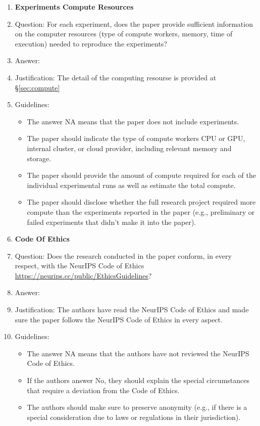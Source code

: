 \documentclass[11pt]{article}
\theoremstyle{plain}
\theoremstyle{definition}
\theoremstyle{remark}
\renewcommand{\^}[1]{^{(#1)}}
\begin{document}
\begin{enumerate}
\item {\bf Experiments Compute Resources}
    \item[] Question: For each experiment, does the paper provide sufficient information on the computer resources (type of compute workers, memory, time of execution) needed to reproduce the experiments?
    \item[] Answer: \answerYes{}
    \item[] Justification: The detail of the computing resourse is provided at \S\ref{sec:compute}
    \item[] Guidelines:
    \begin{itemize}
        \item The answer NA means that the paper does not include experiments.
        \item The paper should indicate the type of compute workers CPU or GPU, internal cluster, or cloud provider, including relevant memory and storage.
        \item The paper should provide the amount of compute required for each of the individual experimental runs as well as estimate the total compute. 
        \item The paper should disclose whether the full research project required more compute than the experiments reported in the paper (e.g., preliminary or failed experiments that didn't make it into the paper). 
    \end{itemize}

\item {\bf Code Of Ethics}
    \item[] Question: Does the research conducted in the paper conform, in every respect, with the NeurIPS Code of Ethics \url{https://neurips.cc/public/EthicsGuidelines}?
    \item[] Answer: \answerYes{} 
    \item[] Justification: The authors have read the NeurIPS Code of Ethics and made sure the paper follows the NeurIPS Code of Ethics in every aspect.
    \item[] Guidelines:
    \begin{itemize}
        \item The answer NA means that the authors have not reviewed the NeurIPS Code of Ethics.
        \item If the authors answer No, they should explain the special circumstances that require a deviation from the Code of Ethics.
        \item The authors should make sure to preserve anonymity (e.g., if there is a special consideration due to laws or regulations in their jurisdiction).
    \end{itemize}


\end{enumerate}
\end{document}
